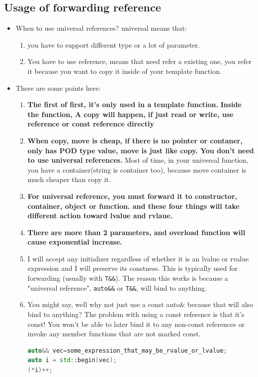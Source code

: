 \documentclass[a4paper,11pt,twoside]{book}
\begin{document}
\subsection{Usage of forwarding reference}
\begin{itemize}
\item When to use universal references? universal means that:
\begin{enumerate}
	\item you have to support different type or a lot of parameter. 
	\item You have to use reference, means that need refer a existing one, you refer it because you want to copy it inside of your template function. 
\end{enumerate}

\item There are some points here:
	\begin{enumerate}
		\item \textbf{The first of first, it's only used in a template function.}  \textbf{Inside the function, A copy will happen, if just read or write, use reference or const reference directly}
		
		\item \textbf{When copy, move is cheap, if there is no pointer or contaner, only has POD type value, move is just like copy. You don't need to use universal references.} Most of time, in your universal function, you have a container(string is container too), because move container is much cheaper than copy it.
		
		\item \textbf{For universal reference, you must forward it to constructor, container, object or function. and these four things will take different action toward lvalue and rvlaue.}
		
		\item \textbf{There are more than 2 parameters, and overload function will cause exponential increase.}

		\item I will accept any initializer regardless of whether it is an lvalue or rvalue expression and I will preserve its constness.  This is typically used for forwarding (usually with \texttt{T\&\&}). The reason this works is because a "universal reference", \texttt{auto\&\&} or \texttt{T\&\&}, will bind to anything.  

		\item You might say, well why not just use a const auto\& because that will also bind to anything? The problem with using a const reference is that it's const! You won't be able to later bind it to any non-const references or invoke any member functions that are not marked const.
\begin{lstlisting}[frame=single, language=c++]
auto&& vec=some_expression_that_may_be_rvalue_or_lvalue;
auto i = std::begin(vec);
(*i)++;


\end{lstlisting}
\end{enumerate}
\end{itemize}
\end{document}
